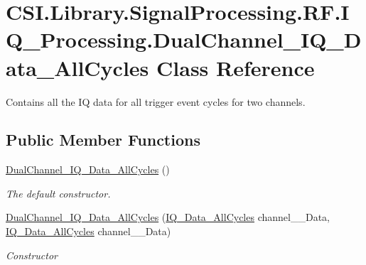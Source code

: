 \hypertarget{class_c_s_i_1_1_library_1_1_signal_processing_1_1_r_f_1_1_i_q___processing_1_1_dual_channel___i_q___data___all_cycles}{}\section{C\+S\+I.\+Library.\+Signal\+Processing.\+R\+F.\+I\+Q\+\_\+\+Processing.\+Dual\+Channel\+\_\+\+I\+Q\+\_\+\+Data\+\_\+\+All\+Cycles Class Reference}
\label{class_c_s_i_1_1_library_1_1_signal_processing_1_1_r_f_1_1_i_q___processing_1_1_dual_channel___i_q___data___all_cycles}


Contains all the IQ data for all trigger event cycles for two channels.  


\subsection*{Public Member Functions}
\begin{DoxyCompactItemize}
\item 
\mbox{\hyperlink{class_c_s_i_1_1_library_1_1_signal_processing_1_1_r_f_1_1_i_q___processing_1_1_dual_channel___i_q___data___all_cycles_a81a3a210f601db4724d113a2c013c29a}{Dual\+Channel\+\_\+\+I\+Q\+\_\+\+Data\+\_\+\+All\+Cycles}} ()
\begin{DoxyCompactList}\small\item\em The default constructor. \end{DoxyCompactList}\item 
\mbox{\hyperlink{class_c_s_i_1_1_library_1_1_signal_processing_1_1_r_f_1_1_i_q___processing_1_1_dual_channel___i_q___data___all_cycles_aec9f06ced3ea655392444aca1577c7ab}{Dual\+Channel\+\_\+\+I\+Q\+\_\+\+Data\+\_\+\+All\+Cycles}} (\mbox{\hyperlink{class_c_s_i_1_1_library_1_1_signal_processing_1_1_r_f_1_1_i_q___processing_1_1_i_q___data___all_cycles}{I\+Q\+\_\+\+Data\+\_\+\+All\+Cycles}} channel\+\_\+\_\+\+Data, \mbox{\hyperlink{class_c_s_i_1_1_library_1_1_signal_processing_1_1_r_f_1_1_i_q___processing_1_1_i_q___data___all_cycles}{I\+Q\+\_\+\+Data\+\_\+\+All\+Cycles}} channel\+\_\+\_\+\+Data)
\begin{DoxyCompactList}\small\item\em Constructor \end{DoxyCompactList}\end{DoxyCompactItemize}
